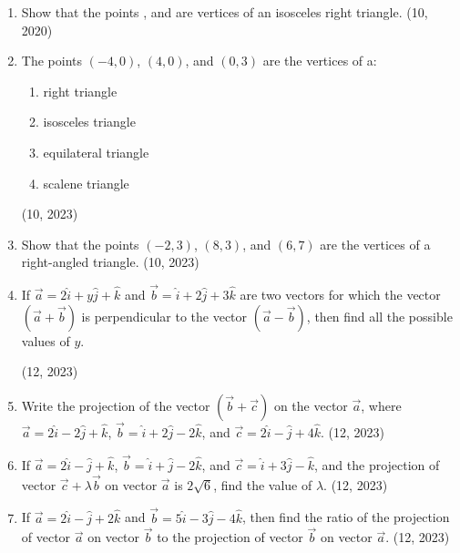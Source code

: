 \begin{enumerate}[label=\thesubsection.\arabic*, ref=\thesubsection.\theenumi]
\item Show that the points ,  and  are vertices of an isosceles right triangle.
\hfill (10, 2020)
    \item The points $(-4,0)$, $(4,0)$, and $(0,3)$ are the vertices of a:
    \begin{enumerate}
        \item right triangle
        \item isosceles triangle
        \item equilateral triangle
        \item scalene triangle
    \end{enumerate}
    \hfill (10, 2023)
    \item Show that the points $(-2,3)$, $(8,3)$, and $(6,7)$ are the vertices of a right-angled triangle.
    \hfill (10, 2023)
    \item If
        $\overrightarrow{a} = 2\hat{i} + y\hat{j} + \hat{k}$
    and
        $\overrightarrow{b} = \hat{i} + 2\hat{j} + 3\hat{k}$
    are two vectors for which the vector $(\overrightarrow{a} + \overrightarrow{b})$ is perpendicular to the vector $(\overrightarrow{a} - \overrightarrow{b})$, then find all the possible values of $y$.

    \hfill (12, 2023)
    \item Write the projection of the vector $(\overrightarrow{b} + \overrightarrow{c})$ on the vector $\overrightarrow{a}$, where
       $ \overrightarrow{a} = 2\hat{i} - 2\hat{j} + \hat{k}$,
       $ \overrightarrow{b} = \hat{i} + 2\hat{j} - 2\hat{k}$,
    and
        $\overrightarrow{c} = 2\hat{i} - \hat{j} + 4\hat{k}$.
    \hfill (12, 2023)

    \item If
      $  \overrightarrow{a} = 2\hat{i} - \hat{j} + \hat{k} $,
      $  \overrightarrow{b} = \hat{i} + \hat{j} - 2\hat{k} $,
    and
        $\overrightarrow{c} = \hat{i} + 3\hat{j} - \hat{k}$,
    and the projection of vector $\overrightarrow{c} + \lambda \overrightarrow{b}$ on vector $\overrightarrow{a}$ is $2\sqrt{6}$, find the value of $\lambda$.
    \hfill (12, 2023)
    \item If
       $ \overrightarrow{a} = 2\hat{i} - \hat{j} + 2\hat{k}$
       and
       $ \overrightarrow{b} = 5\hat{i} - 3\hat{j} -4\hat{k}$,
    then find the ratio of the projection of vector $\overrightarrow{a}$ on vector $\overrightarrow{b}$ to the projection of vector $\overrightarrow{b}$ on vector $\overrightarrow{a}$.
    \hfill (12, 2023)


\end{enumerate}
